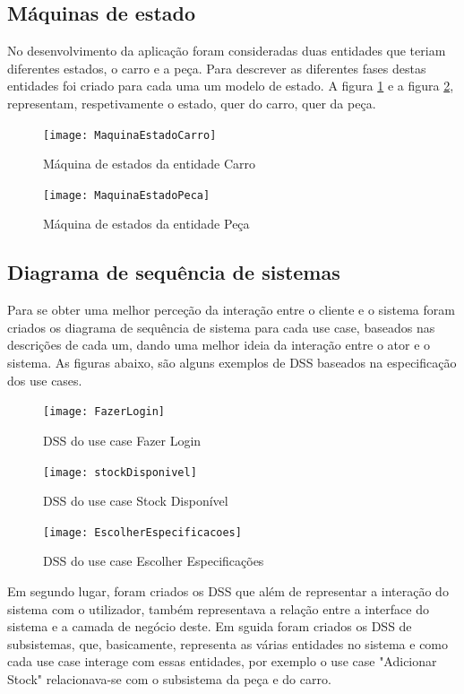 \documentclass[10pt, a4paper]{article}
\begin{document}
\subsection{Máquinas de estado}
No desenvolvimento da aplicação foram consideradas duas entidades que teriam diferentes estados, o carro e a peça. Para descrever as diferentes fases destas entidades foi criado para cada uma um modelo de estado. A figura \ref{ME_Carro} e a figura \ref{ME_Peca}, representam, respetivamente o estado, quer do carro, quer da peça.

\begin{figure}[!htb]
\centering
\texttt{[image: MaquinaEstadoCarro]}
\caption{Máquina de estados da entidade Carro}
\label{ME_Carro}
\end{figure}

\begin{figure}[!htb]
\centering
\texttt{[image: MaquinaEstadoPeca]}
\caption{Máquina de estados da entidade Peça}
\label{ME_Peca}
\end{figure}


\subsection{Diagrama de sequência de sistemas}
Para se obter uma melhor perceção da interação entre o cliente e o sistema foram criados os diagrama de sequência de sistema para cada use case, baseados nas descrições de cada um, dando uma melhor ideia da interação entre o ator e o sistema. As figuras abaixo, são alguns exemplos de DSS baseados na especificação dos use cases.

\begin{figure}[!htb]
\centering
\texttt{[image: FazerLogin]}
\caption{DSS do use case Fazer Login}
\label{DSS FL}
\end{figure}

\begin{figure}[!htb]
\centering
\texttt{[image: stockDisponivel]}
\caption{DSS do use case Stock Disponível}
\label{DSS SD}
\end{figure}

\begin{figure}[!htb]
\centering
\texttt{[image: EscolherEspecificacoes]}
\caption{DSS do use case Escolher Especificações}
\label{DSS EE}
\end{figure}

Em segundo lugar, foram criados os DSS que além de representar a interação do sistema com o utilizador, também representava a relação entre a interface do sistema e a camada de negócio deste. Em sguida foram criados os DSS de subsistemas, que, basicamente, representa as várias entidades no sistema e como cada use case interage com essas entidades, por exemplo o use case "Adicionar Stock" relacionava-se com o subsistema da peça e do carro. 
\end{document}
